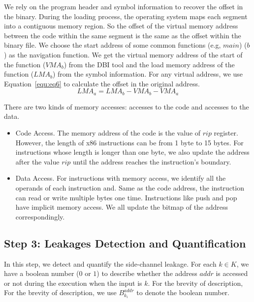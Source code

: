 We rely on the program header and symbol information to recover the offset in the binary. During the loading process, the operating system maps each segment into a contiguous memory region. So the offset of the virtual memory address between the code within the same segment is the same as the offset within the binary file. We choose the start address of some common functions (e.g, $main$) ($b$) as the navigation function. We get the virtual memory address of the start of the function ($\mathit{VMA_b}$) from the DBI tool and the load memory address of the function ($\mathit{LMA_b}$) from the symbol information. For any virtual address, we use Equation~\ref{equ:eq6} to calculate the offset in the original address.
\begin{equation}\label{equ:eq6}
  \mathit{LMA_a} = \mathit{LMA_b} - VMA_b - VMA_a
\end{equation}

There are two kinds of memory accesses: accesses to the code and accesses to the data.
\begin{itemize}
  \item Code Access. The memory address of the code is the value of $rip$ register. However, the length of x86 instructions can be from 1 byte to 15 bytes. For instructions whose length is longer than one byte, we also update the address after the value $rip$ until the address reaches the instruction's boundary.
  \item Data Access. For instructions with memory access, we identify all the operands of each instruction and. Same as the code address, the instruction can read or write multiple bytes one time.  Instructions like \textsf{push} and \textsf{pop} have implicit memory access. We all update the bitmap of the address correspondingly.
\end{itemize}

\subsection{Step 3: Leakages Detection and Quantification}
In this step, we detect and quantify the side-channel leakage. For each $k \in K$, we have a boolean number ($0$ or $1$) to describe whether the address $addr$ is accessed or not during the execution when the input is $k$. For the brevity of description, For the brevity of description, we use $B^{addr}_{k_i}$ to denote the boolean number.



